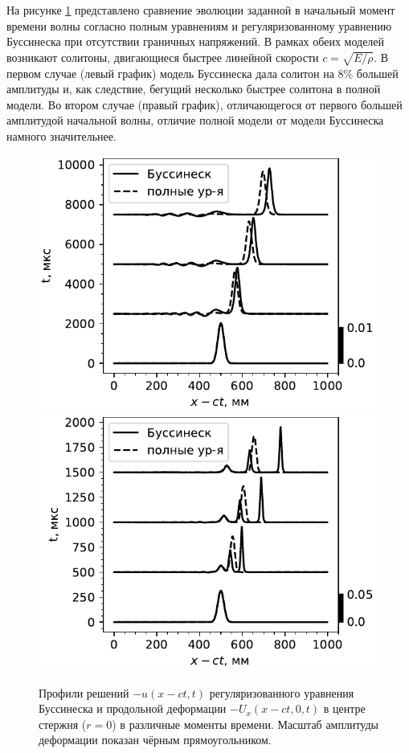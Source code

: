 \documentclass[12pt, a4paper]{article}
\begin{document}

На рисунке \ref{fig:evol_compare} представлено сравнение эволюции заданной в начальный момент времени волны согласно полным уравнениям и регуляризованному уравнению Буссинеска при отсутствии граничных напряжений. В рамках обеих моделей возникают солитоны, двигающиеся быстрее линейной скорости $c=\sqrt{E/\rho}$. В первом случае (левый график) модель Буссинеска дала солитон на 8\% большей амплитуды и, как следствие, бегущий несколько быстрее солитона в полной модели. Во втором случае (правый график), отличающегося от первого большей амплитудой начальной волны, отличие полной модели от модели Буссинеска намного значительнее. 
\begin{figure}[h!]
	\centering
	\includegraphics[width=0.44\linewidth]{Figures/SolEvolCompareSmall}
	\includegraphics[width=0.44\linewidth]{Figures/SolEvolCompareSmall2}
	\caption{Профили решений $-u(x-ct, t)$ регуляризованного уравнения Буссинеска и продольной деформации $-U_x(x - ct, 0, t)$ в центре стержня ($r=0$) в различные моменты времени. Масштаб амплитуды деформации показан чёрным прямоугольником.}
	\label{fig:evol_compare}
	\vspace{-2mm}
\end{figure}
\end{document}
